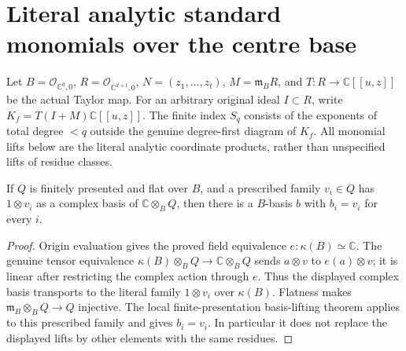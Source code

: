 \section{Literal analytic standard monomials over the centre base}
\label{sec:hironaka-actual-standard-normal-bases}
Let $B=\mathcal O_{\mathbb C^d,0}$, $R=\mathcal O_{\mathbb C^{d+t},0}$,
$N=(z_1,\ldots,z_t)$, $M=\mathfrak m_B R$, and $T:R\to\mathbb C[[u,z]]$ be the actual Taylor map.
For an arbitrary original ideal $I\subset R$, write $K_f=T(I+M)\mathbb C[[u,z]]$.
The finite index $S_q$ consists of the exponents of total degree $<q$ outside the genuine degree-first diagram of $K_f$.
All monomial lifts below are the literal analytic coordinate products, rather than unspecified lifts of residue classes.

\begin{theorem}
\label{hir:actual-prescribed-complex-basis-lift}
\leanok
If $Q$ is finitely presented and flat over $B$, and a prescribed family $v_i\in Q$ has
$1\otimes v_i$ as a complex basis of $\mathbb C\otimes_BQ$, then there is a $B$-basis $b$ with $b_i=v_i$ for every $i$.
\end{theorem}
\begin{proof}
Origin evaluation gives the proved field equivalence $e:\kappa(B)\simeq\mathbb C$.
The genuine tensor equivalence $\kappa(B)\otimes_BQ\to\mathbb C\otimes_BQ$ sends $a\otimes v$ to $e(a)\otimes v$;
it is linear after restricting the complex action through $e$.
Thus the displayed complex basis transports to the literal family $1\otimes v_i$ over $\kappa(B)$.
Flatness makes $\mathfrak m_B\otimes_BQ\to Q$ injective.
The local finite-presentation basis-lifting theorem applies to this prescribed family and gives $b_i=v_i$.
In particular it does not replace the displayed lifts by other elements with the same residues.
\end{proof}

